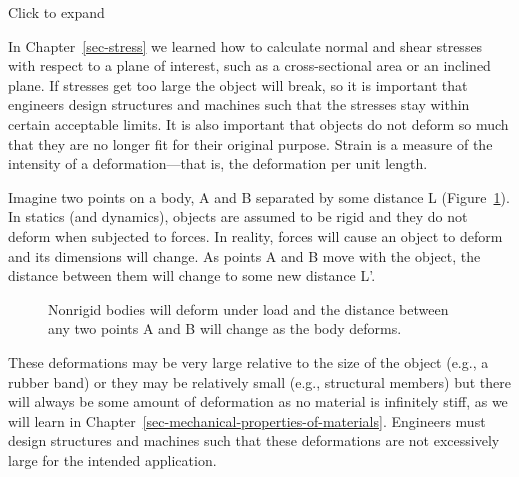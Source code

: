 \documentclass[
  letterpaper,
  DIV=11,
  numbers=noendperiod]{scrreprt}
\theoremstyle{definition}
\theoremstyle{remark}
\begin{document}

Click to expand

In Chapter~\ref{sec-stress} we learned how to calculate normal and shear
stresses with respect to a plane of interest, such as a cross-sectional
area or an inclined plane. If stresses get too large the object will
break, so it is important that engineers design structures and machines
such that the stresses stay within certain acceptable limits. It is also
important that objects do not deform so much that they are no longer fit
for their original purpose. Strain is a measure of the intensity of a
deformation---that is, the deformation per unit length.

Imagine two points on a body, A and B separated by some distance L
(Figure~\ref{fig-3.1}). In statics (and dynamics), objects are assumed
to be rigid and they do not deform when subjected to forces. In reality,
forces will cause an object to deform and its dimensions will change. As
points A and B move with the object, the distance between them will
change to some new distance L'.

\begin{figure}


\caption{\label{fig-3.1}Nonrigid bodies will deform under load and the
distance between any two points A and B will change as the body
deforms.}

\end{figure}%

These deformations may be very large relative to the size of the object
(e.g., a rubber band) or they may be relatively small (e.g., structural
members) but there will always be some amount of deformation as no
material is infinitely stiff, as we will learn in
Chapter~\ref{sec-mechanical-properties-of-materials}. Engineers must
design structures and machines such that these deformations are not
excessively large for the intended application.
\end{document}
